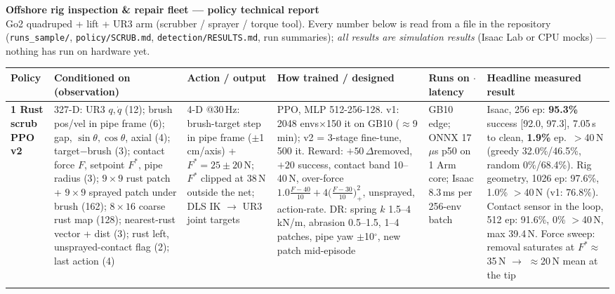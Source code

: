 \documentclass[8pt,a4paper]{extarticle}
\newcommand{\fn}[1]{{\fontsize{5.6}{6.4}\selectfont\ttfamily #1}}
\begin{document}
{\centering
{\large\bfseries Offshore rig inspection \& repair fleet --- policy technical report}\\[1pt]
{\footnotesize Go2 quadruped + lift + UR3 arm (scrubber / sprayer / torque tool). Every number below is read from a
file in the repository (\texttt{runs\_sample/}, \texttt{policy/SCRUB.md}, \texttt{detection/RESULTS.md}, run summaries);
\emph{all results are simulation results} (Isaac Lab or CPU mocks) --- nothing has run on hardware yet.}\par}
\vspace{2pt}

\footnotesize
\noindent\begin{tabularx}{\textwidth}{@{}L{1.85cm}L{4.05cm}L{2.45cm}L{3.75cm}L{1.95cm}Y@{}}
\toprule
\textbf{Policy} & \textbf{Conditioned on (observation)} & \textbf{Action / output} & \textbf{How trained / designed} &
\textbf{Runs on $\cdot$ latency} & \textbf{Headline measured result} \\
\midrule
\textbf{1 Rust scrub PPO v2} \newline \fn{Rig-Scrub-}\newline\fn{Go2UR3Lift-v2} &
327-D: UR3 $q,\dot q$ (12); brush pos/vel in pipe frame (6); gap, $\sin\theta,\cos\theta$, axial (4); target$-$brush (3);
contact force $F$, setpoint $F^*$, pipe radius (3); $9{\times}9$ rust patch + $9{\times}9$ sprayed patch under brush (162);
$8{\times}16$ coarse rust map (128); nearest-rust vector + dist (3); rust left, unsprayed-contact flag (2); last action (4) &
4-D @30\,Hz: brush-target step in pipe frame ($\pm$1\,cm/axis) + $F^*{=}25{\pm}20$\,N; $F^*$ clipped at 38\,N outside the
net; DLS IK $\to$ UR3 joint targets &
PPO, MLP 512-256-128. v1: 2048 envs$\times$150 it on GB10 ($\approx$9 min); v2 = 3-stage
fine-tune, 500 it. Reward: $+50\,\Delta$removed, $+20$ success, contact band 10--40\,N, over-force
$1.0\frac{F-40}{10}+4\big(\frac{F-30}{10}\big)^2_{+}$, unsprayed, action-rate. DR: spring $k$ 1.5--4\,kN/m, abrasion
0.5--1.5, 1--4 patches, pipe yaw $\pm$10$^\circ$, new patch mid-episode &
GB10 edge; ONNX 17\,$\mu$s p50 on 1 Arm core; Isaac 8.3\,ms per 256-env batch &
Isaac, 256 ep: \textbf{95.3\%} success [92.0, 97.3], 7.05\,s to clean, \textbf{1.9\%} ep.\ $>$40\,N (greedy 32.0\%/46.5\%,
random 0\%/68.4\%). Rig geometry, 1026 ep: 97.6\%, 1.0\% $>$40\,N (v1: 76.8\%). Contact sensor in the loop, 512 ep:
91.6\%, 0\% $>$40\,N, max 39.4\,N. Force sweep: removal saturates at $F^*\!\approx$35\,N $\to$ $\approx$20\,N mean
at the tip \\
\addlinespace[1pt]

\end{tabularx}
\end{document}
